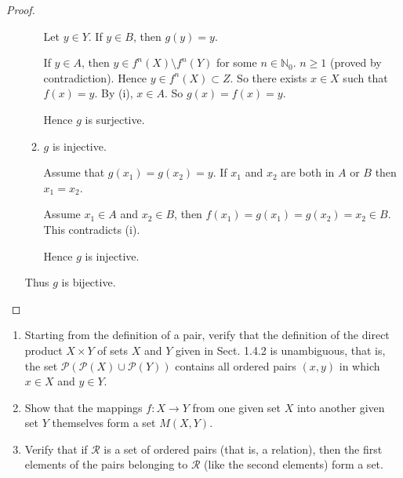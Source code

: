 \begin{proof}
\begin{enumerate}[label={(\alph*)}]
\begin{enumerate}[label={(\roman*)}]
                        Let $y\in Y$. If $y\in B$, then $g(y) = y$.

                        If $y\in A$, then $y\in f^{n}(X)\setminus f^{n}(Y)$ for some $n\in\mathbb{N}_{0}$. $n\geq 1$ (proved by contradiction). Hence $y\in f^{n}(X)\subset Z$. So there exists $x\in X$ such that $f(x) = y$. By (i), $x\in A$. So $g(x) = f(x) = y$.

                        Hence $g$ is surjective.
                  \item $g$ is injective.

                        Assume that $g(x_{1}) = g(x_{2}) = y$. If $x_{1}$ and $x_{2}$ are both in $A$ or $B$ then $x_{1} = x_{2}$.

                        Assume $x_{1}\in A$ and $x_{2}\in B$, then $f(x_{1}) = g(x_{1}) = g(x_{2}) = x_{2}\in B$. This contradicts (i).

                        Hence $g$ is injective.
              \end{enumerate}

              Thus $g$ is bijective.
    \end{enumerate}
\end{proof}
\newpage

\begin{exercise}
    \begin{enumerate}[label={(\alph*)}]
        \item Starting from the definition of a pair, verify that the definition of the direct product $X \times Y$ of sets $X$ and $Y$ given in Sect. 1.4.2 is unambiguous, that is, the set $\mathcal{P}(\mathcal{P}(X)\cup \mathcal{P}(Y))$ contains all ordered pairs $(x, y)$ in which $x \in X$ and $y \in Y$.
        \item Show that the mappings $f: X \to Y$ from one given set $X$ into another given set $Y$ themselves form a set $M(X, Y)$.
        \item Verify that if $\mathcal{R}$ is a set of ordered pairs (that is, a relation), then the first elements of the pairs belonging to $\mathcal{R}$ (like the second elements) form a set.
    \end{enumerate}
\end{exercise}

